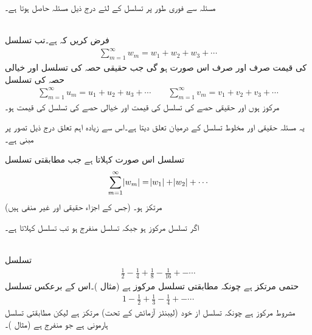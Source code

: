 مسئلہ  سے  فوری طور پر تسلسل کے لئے درج ذیل مسئلہ حاصل ہوتا ہے۔

\quad {}\\
فرض کریں کہ  ہے۔تب تسلسل
\begin{align*}
\sum_{m=1}^{\infty} w_m=w_1+w_2+w_3+\cdots
\end{align*}
کی قیمت صرف اور صرف اس صورت  ہو گی جب حقیقی حصہ کی تسلسل اور خیالی حصہ کی تسلسل 
\begin{align*}
\sum_{m=1}^{\infty} u_m=u_1+u_2+u_3+\cdots\quad \text{}\quad \sum_{m=1}^{\infty} v_m=v_1+v_2+v_3+\cdots
\end{align*}
مرکوز ہوں اور حقیقی حصے کی تسلسل کی قیمت  اور خیالی حصے کی تسلسل کی قیمت   ہو۔

یہ مسئلہ حقیقی اور مخلوط تسلسل کے درمیان تعلق دیتا ہے۔اس سے زیادہ اہم تعلق درج ذیل تصور پر مبنی ہے۔ 

تسلسل  اس صورت   کہلاتا ہے جب مطابقتی تسلسل
\begin{align}\label{مساوات_ترتیب_حتمی_مرتکز}
\sum_{m=1}^{\infty} \abs{w_m}=\abs{w_1}+\abs{w_2}+\cdots
\end{align}
(جس کے اجزاء حقیقی اور غیر منفی ہیں) مرتکز ہو۔

اگر تسلسل  مرکوز ہو جبکہ  تسلسل  منفرج ہو تب تسلسل    کہلاتا ہے۔

\quad {}\\
تسلسل
\begin{align*}
\frac{1}{2}-\frac{1}{4}+\frac{1}{8}-\frac{1}{16}+-\cdots
\end{align*}
حتمی مرتکز ہے چونکہ مطابقتی تسلسل  مرکوز ہے (مثال )۔اس کے برعکس تسلسل
\begin{align*}
1-\frac{1}{2}+\frac{1}{3}-\frac{1}{4}+-\cdots
\end{align*}
مشروط مرکوز ہے چونکہ تسلسل از خود (لیبنٹز آزمائش کے تحت) مرتکز ہے لیکن مطابقتی تسلسل  ہارمونی ہے جو منفرج ہے (مثال )۔

